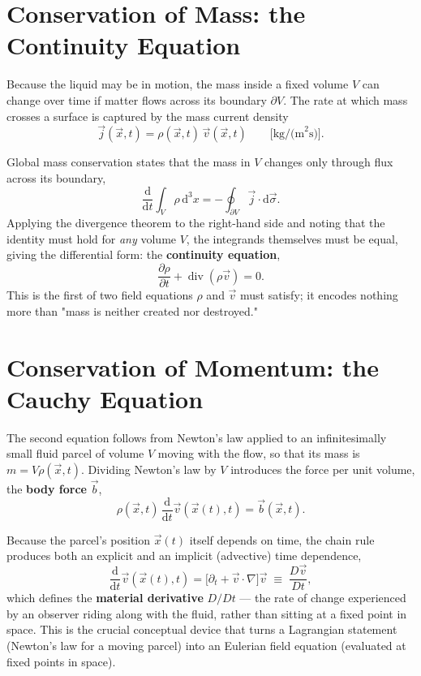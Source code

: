 \documentclass[11pt]{article}
\newcommand{\vv}{\vec{v}}
\newcommand{\vx}{\vec{x}}
\newcommand{\vb}{\vec{b}}
\begin{document}
\section{Conservation of Mass: the Continuity Equation}

Because the liquid may be in motion, the mass inside a fixed volume $V$ can change over time if matter flows across its boundary $\partial V$. The rate at which mass crosses a surface is captured by the mass current density
\begin{equation}
  \vec{j}(\vx,t) = \rho(\vx,t)\,\vv(\vx,t) \qquad \text{[kg/(m}^2\text{s)]}.
\end{equation}

Global mass conservation states that the mass in $V$ changes only through flux across its boundary,
\begin{equation}
  \frac{\mathrm{d}}{\mathrm{d}t}\int_V \rho\,\mathrm{d}^3x = -\oint_{\partial V} \vec{j}\cdot \mathrm{d}\vec{\sigma}.
\end{equation}
Applying the divergence theorem to the right-hand side and noting that the identity must hold for \emph{any} volume $V$, the integrands themselves must be equal, giving the differential form: the \textbf{continuity equation},
\begin{equation}
  \frac{\partial \rho}{\partial t} + \operatorname{div}(\rho\vv) = 0 .
  \label{eq:continuity}
\end{equation}
This is the first of two field equations $\rho$ and $\vv$ must satisfy; it encodes nothing more than "mass is neither created nor destroyed."

\section{Conservation of Momentum: the Cauchy Equation}

The second equation follows from Newton's law applied to an infinitesimally small fluid parcel of volume $V$ moving with the flow, so that its mass is $m = V\rho(\vx,t)$. Dividing Newton's law by $V$ introduces the force per unit volume, the \textbf{body force} $\vb$,
\begin{equation}
  \rho(\vx,t)\,\frac{\mathrm{d}}{\mathrm{d}t}\vv(\vx(t),t) = \vb(\vx,t).
\end{equation}

Because the parcel's position $\vx(t)$ itself depends on time, the chain rule produces both an explicit and an implicit (advective) time dependence,
\begin{equation}
  \frac{\mathrm{d}}{\mathrm{d}t}\vv(\vx(t),t) = \Big[\partial_t + \vv\cdot\nabla\Big]\vv \;\equiv\; \frac{D\vv}{Dt},
\end{equation}
which defines the \textbf{material derivative} $D/Dt$ — the rate of change experienced by an observer riding along with the fluid, rather than sitting at a fixed point in space. This is the crucial conceptual device that turns a Lagrangian statement (Newton's law for a moving parcel) into an Eulerian field equation (evaluated at fixed points in space).
\end{document}
